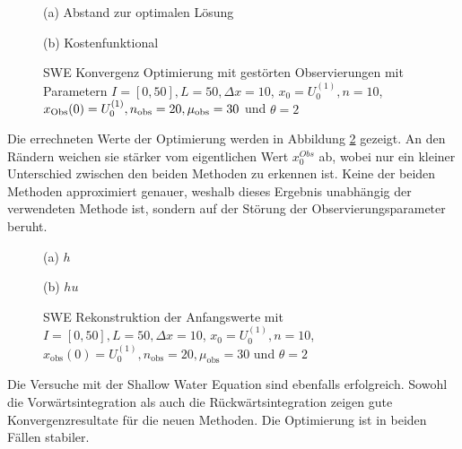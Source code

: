 \begin{figure}[H]
\centering
\begin{minipage}[b]{0.49\linewidth}
 \centering

\caption*{(a) Abstand zur optimalen Lösung}
\end{minipage}
\begin{minipage}[b]{0.49\linewidth}
 \centering

\caption*{(b) Kostenfunktional}
\end{minipage}
\caption{SWE Konvergenz Optimierung mit gestörten Observierungen mit Parametern $I=[0,50],L=50,\Delta x=10$, $x_0=U_0^{(1)},n=10$, $x_{\text{Obs}}(0) = U_0^{(1)}, n_{\text{obs}}=20,\mu_{\text{obs}}=30$ und $\theta=2$}
\label{fig:sweConvergenceOptNoise}
\end{figure}

Die errechneten Werte der Optimierung werden in Abbildung \ref{fig:sweOptInitValues} gezeigt. An den Rändern weichen sie stärker vom eigentlichen Wert $x_0^{Obs}$ ab, wobei nur ein kleiner Unterschied zwischen den beiden Methoden zu erkennen ist. Keine der beiden Methoden approximiert genauer, weshalb dieses Ergebnis unabhängig der verwendeten Methode ist, sondern auf der Störung der Observierungsparameter beruht.
\begin{figure}[H]
\begin{minipage}[b]{0.49\linewidth}
\centering

\caption*{(a) $h$}
\end{minipage}
\begin{minipage}[b]{0.49\linewidth}
\centering

\caption*{(b) $hu$}
\end{minipage}
\caption{SWE Rekonstruktion der Anfangswerte mit $I=[0,50],L=50,\Delta x=10$, $x_0=U_0^{(1)},n=10$, $x_{\text{obs}}(0) = U_0^{(1)}, n_{\text{obs}}=20,\mu_{\text{obs}}=30$ und $\theta=2$}
\label{fig:sweOptInitValues}
\end{figure}

Die Versuche mit der Shallow Water Equation sind ebenfalls erfolgreich. Sowohl die Vorwärtsintegration als auch die Rückwärtsintegration zeigen gute Konvergenzresultate für die neuen Methoden. Die Optimierung ist in beiden Fällen stabiler.
